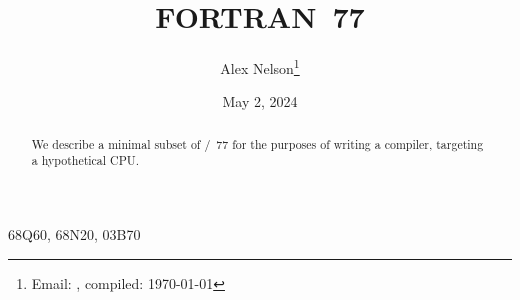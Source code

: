 \documentclass[dvipsnames,HTML]{siamart190516} %
\title{FORTRAN~77}
\author{Alex Nelson\thanks{Email: \email{pqnelson@gmail.com}, compiled: \today}}
\date{May 2, 2024}
\begin{document}
\maketitle

\begin{abstract}
We describe a minimal subset of \FORTRAN/~77 for the purposes of writing a
compiler, targeting a hypothetical CPU.
\end{abstract}

\begin{AMS}
  68Q60, %
  68N20, %
  03B70  %
\end{AMS}

\tableofcontents




\nocite{*}

\end{document}
